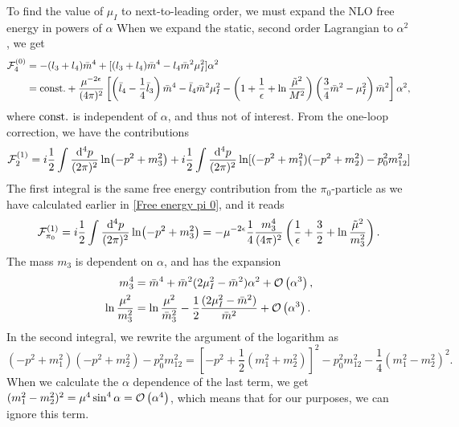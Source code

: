 To find the value of $\mu_I$ to next-to-leading order, we must expand the NLO free energy in powers of $\alpha$
When we expand the static, second order Lagrangian to $\alpha^2$, we get
\begin{align}
    \Ef_4^{(0)}
    &= - (l_3 + l_4)\bar m^4 + [(l_3 + l_4)\bar m^4 -l_4 \bar m^2\mu_I^2]\alpha^2
    \\
    & =
    \const + 
    \frac{\mu^{-2\epsilon}}{(4\pi)^2}
    \left[
        \left(
            \bar l_4 - \frac{1}{4}\bar l_3
        \right)\bar m^4
        -\bar l_4\bar m^2\mu_I^2
        -\left(
            1 + \frac{1}{\epsilon} + \ln\frac{\tilde \mu^2}{M^2}
        \right)
        \left(\frac{3}{4}\bar m^2 - \mu_I^2\right)\bar m^2
    \right]\alpha^2,
\end{align}
where $\const$ is independent of $\alpha$, and thus not of interest.
From the one-loop correction, we have the contributions
\begin{equation}
    \Ef_2^{(1)} = i \frac{1}{2}\int \frac{\dd^4 p}{(2\pi)^2} \ln(-p^2 + m_3^2)
    +  i \frac{1}{2} \int \frac{\dd^4 p}{(2\pi)^2} \ln[(-p^2 + m_1^2)(-p^2 + m_2^2) - p_0^2 m_{12}^2]
\end{equation}
The first integral is the same free energy contribution from the $\pi_0$-particle as we have calculated earlier in \cref{Free energy pi 0}, and it reads
\begin{equation}
    \Ef_{\pi_0}^{(1)}
    = i \frac{1}{2}\int \frac{\dd^4 p}{(2\pi)^2} \ln(-p^2 + m_3^2)
    = - \mu^{-2\epsilon}\frac{1}{4} \frac{m_3^4}{(4 \pi)^2}
    \left(\frac{1}{\epsilon} + \frac{3}{2} + \ln \frac{\tilde \mu^2}{m_3^2}\right).
\end{equation}
The mass $m_3$ is dependent on $\alpha$, and has the expansion
\begin{align*}
    m_3^4
    &= \bar m^4 + \bar m^2(2\mu_I^2 - \bar m^2)\alpha^2+ \Oh[3]{\alpha}, \\
    \ln \frac{\mu^2}{m_3^2}
    &=
    \ln \frac{\mu^2}{\bar m_3^2} - \frac{1}{2} \frac{(2\mu_I^2 - \bar m^2)}{\bar m^2}+ \Oh[3]{\alpha}.
\end{align*}
In the second integral, we rewrite the argument of the logarithm as
\begin{equation}
    (-p^2 + m_1^2)(-p^2 + m_2^2) - p_0^2 m_{12}^2
    =  \left[-p^2 + \frac{1}{2}(m_1^2 + m_2^2)\right]^2 - p_0^2 m_{12}^2 - \frac{1}{4}(m_1^2 - m_2^2)^2.
\end{equation}
When we calculate the $\alpha$ dependence of the last term, we get  $(m_1^2 - m_2^2)^2 = \mu^4 \sin^4\alpha = \Oh[4]{\alpha}$, which means that for our purposes, we can ignore this term.
